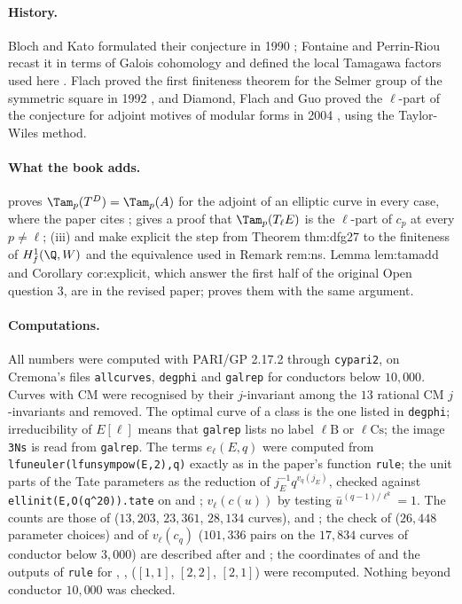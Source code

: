 \paragraph{History.} Bloch and Kato formulated their conjecture in 1990 \cite{BlochKato}; Fontaine and Perrin-Riou recast it in terms of Galois cohomology and defined
the local Tamagawa factors used here \cite{FPR94}. Flach proved the first finiteness theorem for the Selmer group of the symmetric square in 1992 \cite{Flach92}, and
Diamond, Flach and Guo proved the $\ell$-part of the conjecture for adjoint motives of modular forms in 2004 \cite{DFG04}, using the Taylor-Wiles method.

\paragraph{What the book adds.}  proves $\Tam_p(T^D)=\Tam_p(A)$ for the adjoint of an elliptic curve in every case, where the paper cites \cite[(57)]{DFG04};
 gives a proof that $\Tam_p(T_\ell E)$ is the $\ell$-part of $c_p$ at every $p\ne\ell$; (iii) and
 make explicit the step from Theorem thm:dfg27 to the finiteness of $H^1_f(\Q,W)$ and the equivalence used in Remark rem:ns. Lemma
lem:tamadd and Corollary cor:explicit, which answer the first half of the original Open question 3, are in the revised paper;  proves them
with the same argument.

\paragraph{Computations.} All numbers were computed with PARI/GP 2.17.2 \cite{PARI} through \texttt{cypari2}, on Cremona's files \texttt{allcurves}, \texttt{degphi} and
\texttt{galrep} \cite{ecdata} for conductors below $10{,}000$. Curves with CM were recognised by their $j$-invariant among the $13$ rational CM $j$-invariants and removed. The
optimal curve of a class is the one listed in \texttt{degphi}; irreducibility of $E[\ell]$ means that \texttt{galrep} lists no label $\ell\mathrm B$ or $\ell\mathrm{Cs}$; the image \texttt{3Ns} is
read from \texttt{galrep}. The terms $e_\ell(E,q)$ were computed from \texttt{lfuneuler(lfunsympow(E,2),q)} exactly as in the paper's function \texttt{rule}; the unit parts of the
Tate parameters as the reduction of $j_E^{-1}q^{v_q(j_E)}$, checked against \texttt{ellinit(E,O(q\^{}20)).tate} on  and ; $v_\ell(c(u))$ by testing
$\bar u^{(q-1)/\ell^k}=1$. The counts are those of  ($13{,}203$, $23{,}361$, $28{,}134$ curves),  and
; the check of  ($26{,}448$ parameter choices) and of $v_\ell(c_q)$ ($101{,}336$ pairs on the $17{,}834$ curves of conductor
below $3{,}000$) are described after  and ; the coordinates of  and the outputs of
\texttt{rule} for , ,  ($[1,1]$, $[2,2]$, $[2,1]$) were recomputed. Nothing beyond conductor $10{,}000$ was checked.
